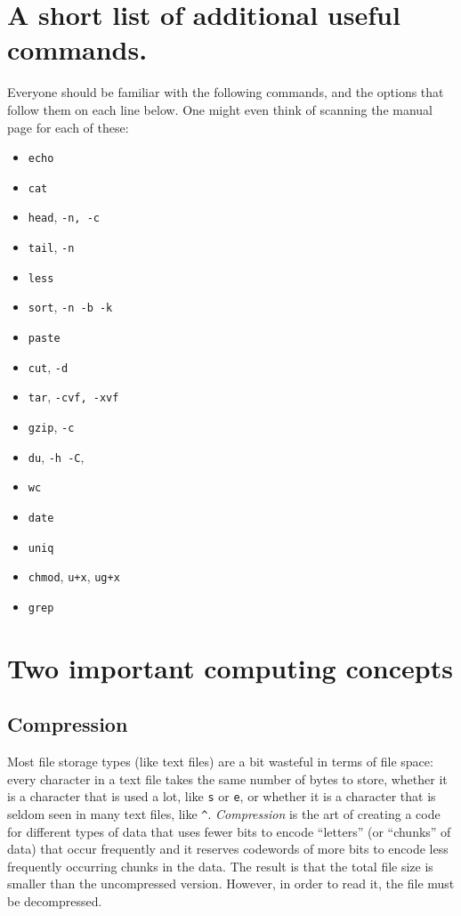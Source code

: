 \documentclass[]{krantz}
\providecommand{\tightlist}{%
  \setlength{\itemsep}{0pt}\setlength{\parskip}{0pt}}
\begin{document}
\hypertarget{a-short-list-of-additional-useful-commands.}{%
\section{A short list of additional useful commands.}\label{a-short-list-of-additional-useful-commands.}}

Everyone should be familiar with the following commands, and the
options that follow them on each line below. One might even think of
scanning the manual page for each of these:

\begin{itemize}
\tightlist
\item
  \texttt{echo}
\item
  \texttt{cat}
\item
  \texttt{head}, \texttt{-n,\ -c}
\item
  \texttt{tail}, \texttt{-n}
\item
  \texttt{less}
\item
  \texttt{sort}, \texttt{-n\ -b\ -k}
\item
  \texttt{paste}
\item
  \texttt{cut}, \texttt{-d}
\item
  \texttt{tar}, \texttt{-cvf,\ -xvf}
\item
  \texttt{gzip}, \texttt{-c}
\item
  \texttt{du}, \texttt{-h\ -C},
\item
  \texttt{wc}
\item
  \texttt{date}
\item
  \texttt{uniq}
\item
  \texttt{chmod}, \texttt{u+x}, \texttt{ug+x}
\item
  \texttt{grep}
\end{itemize}

\hypertarget{two-important-computing-concepts}{%
\section{Two important computing concepts}\label{two-important-computing-concepts}}

\hypertarget{compression}{%
\subsection{Compression}\label{compression}}

Most file storage types (like text files) are a bit wasteful in terms of
file space: every character in a text file takes the same number of bytes to
store, whether it is a character that is used a lot, like \texttt{s} or \texttt{e}, or whether
it is a character that is seldom seen in many text files, like \texttt{\^{}}. \emph{Compression}
is the art of creating a code for different types of data that uses fewer bits to
encode ``letters'' (or ``chunks'' of data) that occur frequently and it reserves codewords of
more bits to encode less frequently occurring chunks in the data. The result is that the
total file size is smaller than the uncompressed version. However, in order to read it,
the file must be decompressed.
\end{document}
